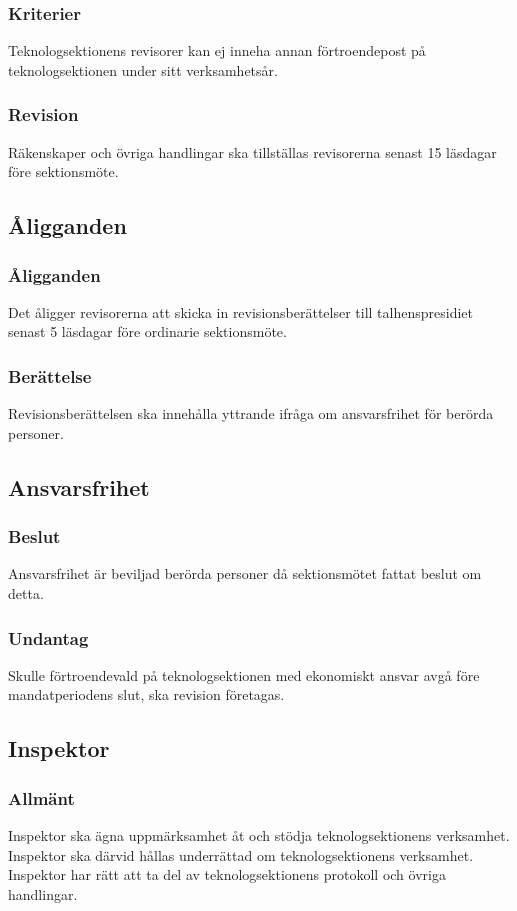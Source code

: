 \documentclass[a4paper]{dtek}
\begin{document}
\subsubsection{Kriterier}
Teknologsektionens revisorer kan ej inneha annan förtroendepost på teknologsektionen under sitt verksamhetsår.
\subsubsection{Revision}
Räkenskaper och övriga handlingar ska tillställas revisorerna senast 15 läsdagar före sektionsmöte.
\subsection{Åligganden}
\subsubsection{Åligganden}
Det åligger revisorerna att skicka in revisionsberättelser till talhenspresidiet senast 5 läsdagar före ordinarie sektionsmöte.
\subsubsection{Berättelse}
Revisionsberättelsen ska innehålla yttrande ifråga om ansvarsfrihet för berörda personer.
\subsection{Ansvarsfrihet}
\subsubsection{Beslut}
Ansvarsfrihet är beviljad berörda personer då sektionsmötet fattat beslut om detta.
\subsubsection{Undantag}
Skulle förtroendevald på teknologsektionen med ekonomiskt ansvar avgå före mandatperiodens slut, ska revision företagas.
\subsection{Inspektor}
\subsubsection{Allmänt}
Inspektor ska ägna uppmärksamhet åt och stödja teknologsektionens verksamhet. Inspektor ska därvid hållas underrättad om teknologsektionens verksamhet. Inspektor har rätt att ta del av teknologsektionens protokoll och övriga handlingar.
\end{document}
